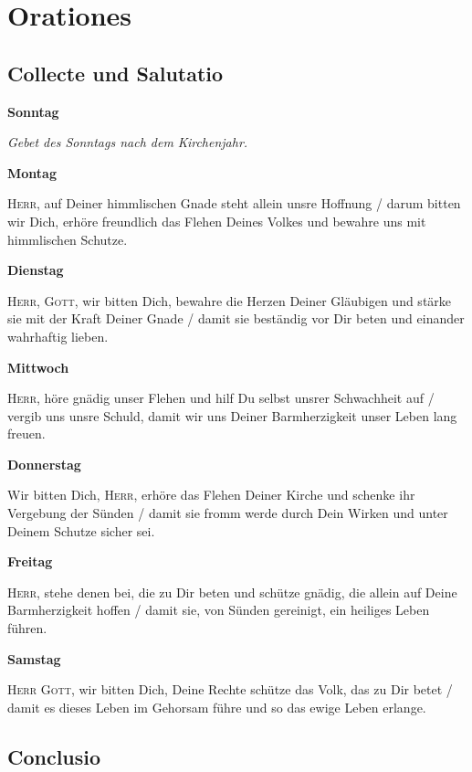 \section*{Orationes}

\subsection*{Collecte und Salutatio\label{Salutatio}}
\begin{multicols}{2}\setlength{\columnseprule}{0.2pt} \textbf{Sonntag}\par
 \textit{Gebet des Sonntags nach dem Kirchenjahr.}   \par
 \textbf{Montag}\par
 \textsc{Herr}, auf Deiner himmlischen Gnade steht allein unsre Hoffnung / darum bitten wir Dich, erhöre freundlich das Flehen Deines Volkes und bewahre uns mit himmlischen Schutze. \par
 \textbf{Dienstag}\par
 \textsc{Herr}, \textsc{Gott}, wir bitten Dich, bewahre die Herzen Deiner Gläubigen und stärke sie mit der Kraft Deiner Gnade / damit sie beständig vor Dir beten und einander wahrhaftig lieben. \par
 \textbf{Mittwoch}\par
 \textsc{Herr}, höre gnädig unser Flehen und hilf Du selbst unsrer Schwachheit auf / vergib uns unsre Schuld, damit wir uns Deiner Barmherzigkeit unser Leben lang freuen. \par
 \textbf{Donnerstag}\par
 Wir bitten Dich, \textsc{Herr}, erhöre das Flehen Deiner Kirche und schenke ihr Vergebung der Sünden / damit sie fromm werde durch Dein Wirken und unter Deinem Schutze sicher sei. \par
 \textbf{Freitag}\par
 \textsc{Herr}, stehe denen bei, die zu Dir beten und schütze gnädig, die allein auf Deine Barmherzigkeit hoffen / damit sie, von Sünden gereinigt, ein heiliges Leben führen. \par
\textbf{Samstag}\par
 \textsc{Herr} \textsc{Gott}, wir bitten Dich, Deine Rechte schütze das Volk, das zu Dir betet / damit es dieses Leben im Gehorsam führe und so das ewige Leben erlange. \par
\end{multicols} \subsection*{Conclusio}

